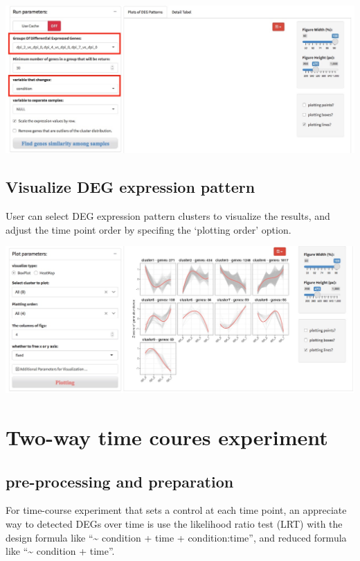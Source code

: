 \documentclass[
  a4paper,
  oneside]{book}
\begin{document}
\includegraphics{images/degp_single_factor_detect.jpeg}

\hypertarget{visualize-deg-expression-pattern}{%
\subsection{Visualize DEG expression pattern}\label{visualize-deg-expression-pattern}}

User can select DEG expression pattern clusters to visualize the results, and adjust the time point order by specifing the `plotting order' option.

\includegraphics{images/degp_single_factor_plots.jpeg}

\hypertarget{two-way-time-coures-experiment}{%
\section{Two-way time coures experiment}\label{two-way-time-coures-experiment}}

\hypertarget{pre-processing-and-preparation-1}{%
\subsection{pre-processing and preparation}\label{pre-processing-and-preparation-1}}

For time-course experiment that sets a control at each time point, an appreciate way to detected DEGs over time is use the likelihood ratio test (LRT) with the design formula like ``\textasciitilde{} condition + time + condition:time'', and reduced formula like ``\textasciitilde{} condition + time''.
\end{document}
